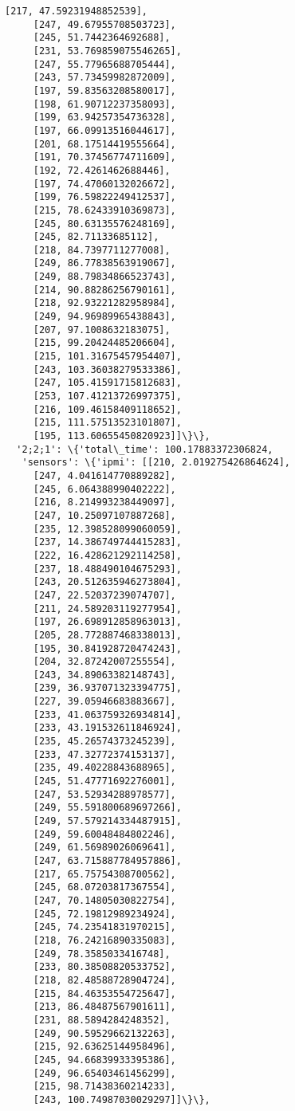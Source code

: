 \documentclass[11pt]{article}
\begin{document}
\begin{tcolorbox}[breakable, size=fbox, boxrule=.5pt, pad at break*=1mm, opacityfill=0]
\begin{Verbatim}[commandchars=\\\{\}]
     [217, 47.59231948852539],
     [247, 49.67955708503723],
     [245, 51.7442364692688],
     [231, 53.769859075546265],
     [247, 55.77965688705444],
     [243, 57.73459982872009],
     [197, 59.83563208580017],
     [198, 61.90712237358093],
     [199, 63.94257354736328],
     [197, 66.09913516044617],
     [201, 68.17514419555664],
     [191, 70.37456774711609],
     [192, 72.4261462688446],
     [197, 74.47060132026672],
     [199, 76.59822249412537],
     [215, 78.62433910369873],
     [245, 80.63135576248169],
     [245, 82.71133685112],
     [218, 84.7397711277008],
     [249, 86.77838563919067],
     [249, 88.79834866523743],
     [214, 90.88286256790161],
     [218, 92.93221282958984],
     [249, 94.96989965438843],
     [207, 97.1008632183075],
     [215, 99.20424485206604],
     [215, 101.31675457954407],
     [243, 103.36038279533386],
     [247, 105.41591715812683],
     [253, 107.41213726997375],
     [216, 109.46158409118652],
     [215, 111.57513523101807],
     [195, 113.60655450820923]]\}\},
  '2;2;1': \{'total\_time': 100.17883372306824,
   'sensors': \{'ipmi': [[210, 2.019275426864624],
     [247, 4.041614770889282],
     [245, 6.064388990402222],
     [216, 8.214993238449097],
     [247, 10.25097107887268],
     [235, 12.398528099060059],
     [237, 14.386749744415283],
     [222, 16.428621292114258],
     [237, 18.488490104675293],
     [243, 20.512635946273804],
     [247, 22.52037239074707],
     [211, 24.589203119277954],
     [197, 26.698912858963013],
     [205, 28.772887468338013],
     [195, 30.841928720474243],
     [204, 32.87242007255554],
     [243, 34.89063382148743],
     [239, 36.937071323394775],
     [227, 39.05946683883667],
     [233, 41.063759326934814],
     [233, 43.191532611846924],
     [235, 45.26574373245239],
     [233, 47.32772374153137],
     [235, 49.40228843688965],
     [245, 51.47771692276001],
     [247, 53.52934288978577],
     [249, 55.591800689697266],
     [249, 57.579214334487915],
     [249, 59.60048484802246],
     [249, 61.56989026069641],
     [247, 63.715887784957886],
     [217, 65.75754308700562],
     [245, 68.07203817367554],
     [247, 70.14805030822754],
     [245, 72.19812989234924],
     [245, 74.23541831970215],
     [218, 76.24216890335083],
     [249, 78.3585033416748],
     [233, 80.38508820533752],
     [218, 82.48588728904724],
     [215, 84.46353554725647],
     [213, 86.48487567901611],
     [231, 88.5894284248352],
     [249, 90.59529662132263],
     [215, 92.63625144958496],
     [245, 94.66839933395386],
     [249, 96.65403461456299],
     [215, 98.71438360214233],
     [243, 100.74987030029297]]\}\},

\end{Verbatim}
\end{tcolorbox}
\end{document}

